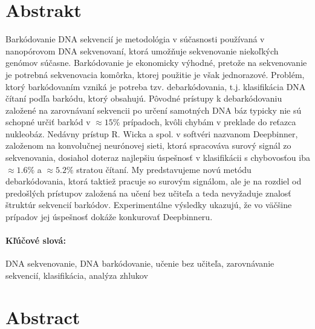 \documentclass[12pt, twoside]{book}
\begin{document}

\newpage 
\section*{Abstrakt}


Barkódovanie DNA sekvencií je metodológia v súčasnosti používaná v nanopórovom DNA sekvenovaní, ktorá umožňuje sekvenovanie niekoľkých genómov súčasne. Barkódovanie je ekonomicky výhodné, pretože na sekvenovanie je potrebná sekvenovacia komôrka, ktorej použitie je však jednorazové. Problém, ktorý barkódovaním vzniká je potreba tzv. debarkódovania, t.j. klasifikácia DNA čítaní podľa barkódu, ktorý obsahujú. Pôvodné prístupy k debarkódovaniu založené na zarovnávaní sekvencii po určení samotných DNA báz typicky nie sú schopné určiť barkód v $\approx 15\%$ prípadoch, kvôli chybám v preklade do reťazca nukleobáz. Nedávny prístup R. Wicka a spol. \cite{Deepbinner} v softvéri nazvanom Deepbinner, založenom na konvolučnej neurónovej sieti, ktorá spracováva surový signál zo sekvenovania, dosiahol doteraz najlepšiu úspešnosť v klasifikácii s chybovosťou iba  $\approx 1.6\%$ a $\approx 5.2\%$ stratou čítaní. My predstavujeme novú metódu debarkódovania, ktorá taktiež pracuje so surovým signálom, ale je na rozdiel od predošlých prístupov založená na učení bez učiteľa a teda nevyžaduje znalosť štruktúr sekvencií barkódov. Experimentálne výsledky ukazujú, že vo väčšine prípadov jej úspešnosť dokáže konkurovať Deepbinneru.

\paragraph*{Kľúčové slová:} DNA sekvenovanie, DNA barkódovanie, učenie bez učiteľa, zarovnávanie sekvencií, klasifikácia, analýza zhlukov


\newpage 
\section*{Abstract}
\end{document}
